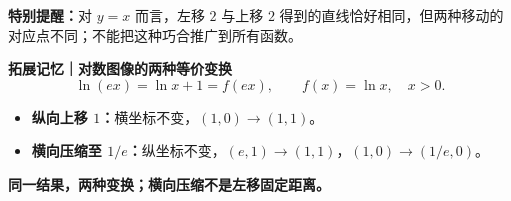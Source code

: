 \begin{summarybox}
  \textbf{特别提醒：}对 $y=x$ 而言，左移 $2$ 与上移 $2$ 得到的直线恰好相同，但两种移动的对应点不同；不能把这种巧合推广到所有函数。

  \medskip
  \textbf{\textcolor{CSummary}{拓展记忆｜对数图像的两种等价变换}}
  \[
    \boxed{\ln(ex)=\ln x+1=f(ex)},\qquad f(x)=\ln x,\quad x>0.
  \]
  \begin{center}
    
  \end{center}
  \begin{itemize}[leftmargin=*,itemsep=0.3em]
    \item \textbf{纵向上移 $1$：}横坐标不变，$(1,0)\to(1,1)$。
    \item \textbf{横向压缩至 $1/e$：}纵坐标不变，$(e,1)\to(1,1)$，$(1,0)\to(1/e,0)$。
  \end{itemize}
  \textbf{同一结果，两种变换；横向压缩不是左移固定距离。}

\end{summarybox}
